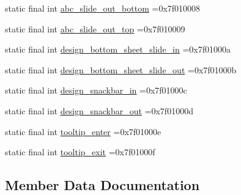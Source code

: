 \begin{DoxyCompactItemize}
\item 
static final int \mbox{\hyperlink{classbr_1_1unb_1_1cic_1_1mp_1_1marketmaster_1_1test_1_1R_1_1anim_a75ac911b17646c20b4044931f2460cda}{abc\+\_\+slide\+\_\+out\+\_\+bottom}} =0x7f010008
\item 
static final int \mbox{\hyperlink{classbr_1_1unb_1_1cic_1_1mp_1_1marketmaster_1_1test_1_1R_1_1anim_a097506b0d65efc430d4b9ae6dc02e8ca}{abc\+\_\+slide\+\_\+out\+\_\+top}} =0x7f010009
\item 
static final int \mbox{\hyperlink{classbr_1_1unb_1_1cic_1_1mp_1_1marketmaster_1_1test_1_1R_1_1anim_a08eecb1640ec078a718bde4ff018cf79}{design\+\_\+bottom\+\_\+sheet\+\_\+slide\+\_\+in}} =0x7f01000a
\item 
static final int \mbox{\hyperlink{classbr_1_1unb_1_1cic_1_1mp_1_1marketmaster_1_1test_1_1R_1_1anim_a37773e53f70da43be66a2d0b0959a6f2}{design\+\_\+bottom\+\_\+sheet\+\_\+slide\+\_\+out}} =0x7f01000b
\item 
static final int \mbox{\hyperlink{classbr_1_1unb_1_1cic_1_1mp_1_1marketmaster_1_1test_1_1R_1_1anim_ad8cae776ac869e6b0428f4879dfc5ef9}{design\+\_\+snackbar\+\_\+in}} =0x7f01000c
\item 
static final int \mbox{\hyperlink{classbr_1_1unb_1_1cic_1_1mp_1_1marketmaster_1_1test_1_1R_1_1anim_a03a30204bd9469785dce21b0389e5b3d}{design\+\_\+snackbar\+\_\+out}} =0x7f01000d
\item 
static final int \mbox{\hyperlink{classbr_1_1unb_1_1cic_1_1mp_1_1marketmaster_1_1test_1_1R_1_1anim_af52946c931500780c496aa820ba96126}{tooltip\+\_\+enter}} =0x7f01000e
\item 
static final int \mbox{\hyperlink{classbr_1_1unb_1_1cic_1_1mp_1_1marketmaster_1_1test_1_1R_1_1anim_a56996cdf98d953b67c9c66be929645bb}{tooltip\+\_\+exit}} =0x7f01000f
\end{DoxyCompactItemize}


\subsection{Member Data Documentation}
\mbox{\label{classbr_1_1unb_1_1cic_1_1mp_1_1marketmaster_1_1test_1_1R_1_1anim_a8d15c45fc97526c59e932fcf6292be82}} 
